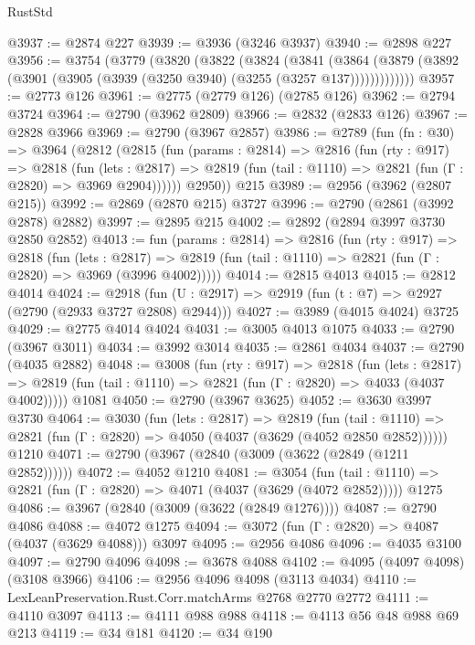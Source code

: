 \begin{lexlean}{RustStd}
\begin{coremodule}
{\begin{coremodule}
{{{{{{{{{{{{{{{{{{{{{{{{{{@3937 := @2874 @227
@3939 := @3936 (@3246 @3937)
@3940 := @2898 @227
@3956 := @3754
    (@3779
      (@3820
        (@3822
          (@3824
            (@3841
              (@3864
                (@3879 (@3892 (@3901 (@3905 (@3939 (@3250 @3940) (@3255 (@3257 @137)))))))))))))
@3957 := @2773 @126
@3961 := @2775 (@2779 @126) (@2785 @126)
@3962 := @2794 @3724
@3964 := @2790 (@3962 @2809)
@3966 := @2832 (@2833 @126)
@3967 := @2828 @3966
@3969 := @2790 (@3967 @2857)
@3986 := @2789
    (fun (fn : @30) =>
    @3964
      (@2812
        (@2815
          (fun (params : @2814) =>
          @2816
            (fun (rty : @917) =>
            @2818
              (fun (lets : @2817) =>
              @2819 (fun (tail : @1110) => @2821 (fun (Γ : @2820) => @3969 @2904))))))
        @2950))
    @215
@3989 := @2956 (@3962 (@2807 @215))
@3992 := @2869 (@2870 @215) @3727
@3996 := @2790 (@2861 (@3992 @2878) @2882)
@3997 := @2895 @215
@4002 := @2892 (@2894 @3997 @3730 @2850 @2852)
@4013 := fun (params : @2814) =>
  @2816
    (fun (rty : @917) =>
    @2818
      (fun (lets : @2817) =>
      @2819 (fun (tail : @1110) => @2821 (fun (Γ : @2820) => @3969 (@3996 @4002)))))
@4014 := @2815 @4013
@4015 := @2812 @4014
@4024 := @2918 (fun (U : @2917) => @2919 (fun (t : @7) => @2927 (@2790 (@2933 @3727 @2808) @2944)))
@4027 := @3989 (@4015 @4024) @3725
@4029 := @2775 @4014 @4024
@4031 := @3005 @4013 @1075
@4033 := @2790 (@3967 @3011)
@4034 := @3992 @3014
@4035 := @2861 @4034
@4037 := @2790 (@4035 @2882)
@4048 := @3008
    (fun (rty : @917) =>
    @2818
      (fun (lets : @2817) =>
      @2819 (fun (tail : @1110) => @2821 (fun (Γ : @2820) => @4033 (@4037 @4002)))))
    @1081
@4050 := @2790 (@3967 @3625)
@4052 := @3630 @3997 @3730
@4064 := @3030
    (fun (lets : @2817) =>
    @2819
      (fun (tail : @1110) => @2821 (fun (Γ : @2820) => @4050 (@4037 (@3629 (@4052 @2850 @2852))))))
    @1210
@4071 := @2790 (@3967 (@2840 (@3009 (@3622 (@2849 (@1211 @2852))))))
@4072 := @4052 @1210
@4081 := @3054
    (fun (tail : @1110) => @2821 (fun (Γ : @2820) => @4071 (@4037 (@3629 (@4072 @2852)))))
    @1275
@4086 := @3967 (@2840 (@3009 (@3622 (@2849 @1276))))
@4087 := @2790 @4086
@4088 := @4072 @1275
@4094 := @3072 (fun (Γ : @2820) => @4087 (@4037 (@3629 @4088))) @3097
@4095 := @2956 @4086
@4096 := @4035 @3100
@4097 := @2790 @4096
@4098 := @3678 @4088
@4102 := @4095 (@4097 @4098) (@3108 @3966)
@4106 := @2956 @4096 @4098 (@3113 @4034)
@4110 := LexLeanPreservation.Rust.Corr.matchArms @2768 @2770 @2772
@4111 := @4110 @3097
@4113 := @4111 @988 @988
@4118 := @4113 @56 @48 @988 @69 @213
@4119 := @34 @181
@4120 := @34 @190
}}}}}}}}}}}}}}}}}}}}}}}}}}
\end{coremodule}}
\end{coremodule}
\end{lexlean}
